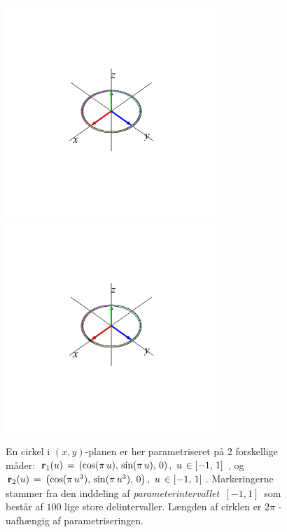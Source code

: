 \begin{figure}[ht]
\centerline{\includegraphics[height=80mm]{FIGS/plotC1}\, \, \, \quad  \includegraphics[height=80mm]{FIGS/plotC2}}
\begin{center}
\caption{\small{En cirkel i $(x, y)$-planen er
her parametriseret på 2 forskellige måder: ${\bf
r}_{1}(u) \, = \, \left(\cos(\pi\, u), \,
\sin(\pi \,u),\, 0\right), \, \, u \, \in [-1,\,
1]\, $, og ${\bf r}_{2}(u) \, = \,
\left(\cos(\pi\, u^{3}), \,\sin(\pi \,u^{3}),\,
0\right), \, \, u \, \in [-1, \,1]\, $.
Mar\-ke\-ringerne stammer fra den inddeling af
{\em parameterintervallet $\, [-1, 1]\,$} som
består af $100$ lige store delintervaller. Længden
af cirklen er $2\pi$ - uafhængig af
parametriseringen.}} \label{figc12}
\end{center}
\end{figure}




